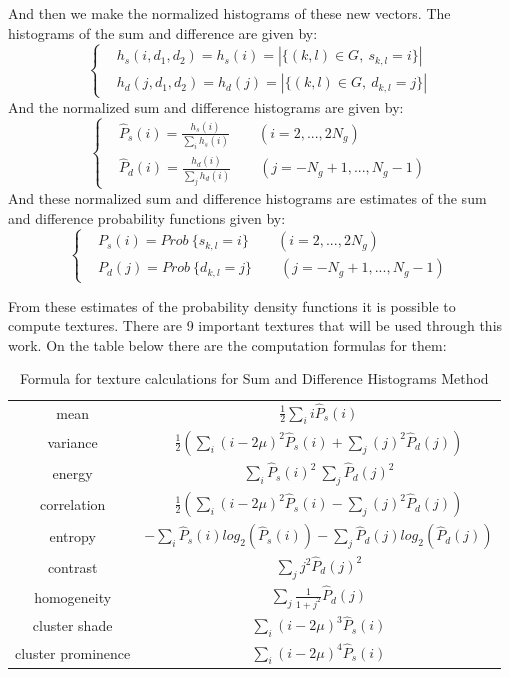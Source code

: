 And then we make the normalized histograms of these new vectors. The histograms of the sum and difference are given by:
\begin{equation}
\begin{cases}
&h_s(i, d_1, d_2) = h_s(i) = |\{(k,l) \in G, \ s_{k,l} = i\}|\\
&h_d(j, d_1, d_2) = h_d(j) = |\{(k,l) \in G, \ d_{k,l} = j\}|
\end{cases}
\end{equation}
And the normalized sum and difference histograms are given by:
\begin{equation}
\begin{cases}
&\hat{P}_s(i) = \frac{h_s(i)}{\sum_i h_s(i)} \qquad (i=2,...,2N_g)\\
&\hat{P}_d(i) = \frac{h_d(i)}{\sum_j h_d(i)} \qquad (j=-N_g+1, ... ,N_g-1)
\end{cases}
\end{equation}
And these normalized sum and difference histograms are estimates of the sum and difference probability functions given by:
\begin{equation}
\begin{cases}
&P_s(i) = Prob\  \{s_{k,l} = i\} \qquad (i=2,...,2N_g)\\
&P_d(j) = Prob\  \{d_{k,l} = j\} \qquad (j=-N_g+1, ... ,N_g-1)
\end{cases}
\end{equation}


From these estimates of the probability density functions it is possible to compute textures. There are 9 important textures that will be used through this work. On the table below there are the computation formulas for them:


\begin{table}[H]
\centering
\begin{tabular}{ |c |c |}
 \hline
 mean & $\frac{1}{2}\sum_i i\hat{P}_s(i)$\\ 
 variance & $\frac{1}{2}(\sum_i (i-2\mu)^2\hat{P}_s(i) + \sum_j (j)^2\hat{P}_d(j))$\\
 energy & $\sum_i \hat{P}_s(i)^2 \ \sum_j \hat{P}_d(j)^2$\\
 correlation & $\frac{1}{2}(\sum_i (i-2\mu)^2\hat{P}_s(i) - \sum_j (j)^2\hat{P}_d(j))$\\
 entropy & $-\sum_i\hat{P}_s(i)log_2(\hat{P}_s(i)) - \sum_j\hat{P}_d(j)log_2(\hat{P}_d(j))$\\
 contrast & $\sum_j j^2 \hat{P}_d(j)^2$\\
 homogeneity & $\sum_j\frac{1}{1+j^2} \hat{P}_d(j)$\\
 cluster shade & $\sum_i (i-2\mu)^3 \hat{P}_s(i)$\\
 cluster prominence & $\sum_i (i-2\mu)^4 \hat{P}_s(i)$\\
 \hline
\end{tabular}
\caption{Formula for texture calculations for Sum and Difference Histograms Method}
\label{table:sum_and_diff_calculations}
\end{table}



